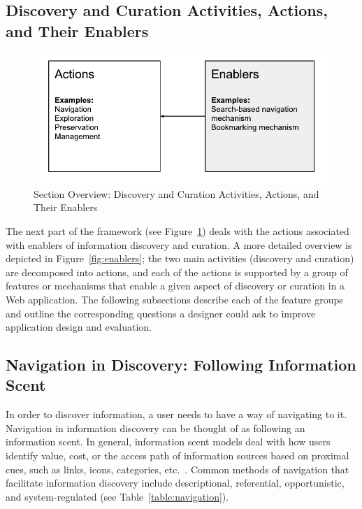 \documentclass{sigchi}
\begin{document}
{\subsection{Discovery and Curation Activities, Actions, and Their Enablers}
\begin{figure}[ht!]
	\noindent
	\centering
    \includegraphics[width=\linewidth]{figures/enablers.pdf}
	\caption{Section Overview: Discovery and Curation Activities, Actions, and Their Enablers}
	\label{fig:enablers_overview} 
\end{figure}
The next part of the framework (see Figure~\ref{fig:enablers_overview}) deals with the actions associated with enablers of information discovery and curation. A more detailed overview is depicted in Figure~\ref{fig:enablers}; the two main activities (discovery and curation) are decomposed into actions, and each of the actions is supported by a group of features or mechanisms that enable a given aspect of discovery or curation in a Web application.  The following subsections describe each of the feature groups and outline the corresponding questions a designer could ask to improve application design and evaluation.  

{\subsection{Navigation in Discovery: Following Information Scent}
In order to discover information, a user needs to have a way of navigating to it. Navigation in information discovery can be thought of as following an information scent. In general, information scent models deal with how users identify value, cost, or the access path of information sources based on proximal cues, such as links, icons, categories, etc.~\cite{pirolli1999information}. Common methods of navigation that facilitate information discovery include descriptional, referential, opportunistic, and system-regulated (see Table~\ref{table:navigation}). 

}}
\end{document}

